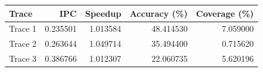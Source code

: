 \begin{tabular}{lrrrr}
\toprule
Trace & IPC & Speedup & Accuracy (\%) & Coverage (\%) \\
\midrule
Trace 1 & 0.235501 & 1.013584 & 48.414530 & 7.059000 \\
Trace 2 & 0.263644 & 1.049714 & 35.494400 & 0.715620 \\
Trace 3 & 0.386766 & 1.012307 & 22.060735 & 5.620196 \\
\bottomrule
\end{tabular}

